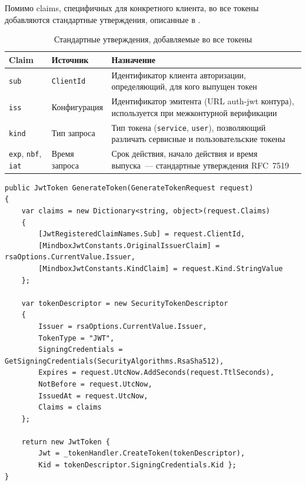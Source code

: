 Помимо claims, специфичных для конкретного клиента,
во все токены добавляются стандартные утверждения,
описанные в .

\begin{table}[h]
  \centering
  \caption{Стандартные утверждения, добавляемые во все токены}
  \label{tab:standard-claims}
  \begin{tabularx}{\textwidth}{l l X}
    \hline
    \textbf{Claim} & \textbf{Источник} & \textbf{Назначение} \\
    \hline
    \texttt{sub} & \texttt{ClientId} &
      Идентификатор клиента авторизации,
      определяющий, для кого выпущен токен \\
    \texttt{iss} & Конфигурация &
      Идентификатор эмитента (URL auth-jwt контура),
      используется при межконтурной верификации \\
    \texttt{kind} & Тип запроса &
      Тип токена (\texttt{service}, \texttt{user}),
      позволяющий различать сервисные и пользовательские токены \\
    \texttt{exp}, \texttt{nbf}, \texttt{iat} & Время запроса &
      Срок действия, начало действия и время выпуска~---
      стандартные утверждения RFC~7519~\cite{RFC7519} \\
    \hline
  \end{tabularx}
\end{table}

\begin{codeblock}
\begin{lstlisting}[language={[Sharp]C}]
public JwtToken GenerateToken(GenerateTokenRequest request)
{
    var claims = new Dictionary<string, object>(request.Claims)
    {
        [JwtRegisteredClaimNames.Sub] = request.ClientId,
        [MindboxJwtConstants.OriginalIssuerClaim] = rsaOptions.CurrentValue.Issuer,
        [MindboxJwtConstants.KindClaim] = request.Kind.StringValue
    };

    var tokenDescriptor = new SecurityTokenDescriptor
    {
        Issuer = rsaOptions.CurrentValue.Issuer,
        TokenType = "JWT",
        SigningCredentials = GetSigningCredentials(SecurityAlgorithms.RsaSha512),
        Expires = request.UtcNow.AddSeconds(request.TtlSeconds),
        NotBefore = request.UtcNow,
        IssuedAt = request.UtcNow,
        Claims = claims
    };

    return new JwtToken {
        Jwt = _tokenHandler.CreateToken(tokenDescriptor),
        Kid = tokenDescriptor.SigningCredentials.Kid };
}
\end{lstlisting}
\end{codeblock}

